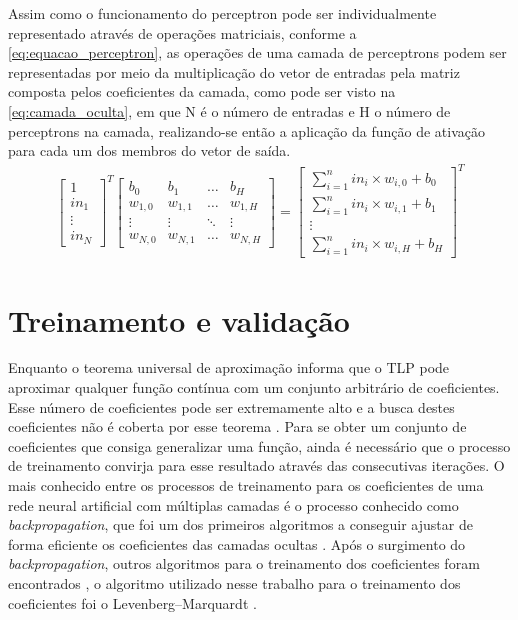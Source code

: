 Assim como o funcionamento do perceptron pode ser individualmente representado através de operações matriciais, conforme a \autoref{eq:equacao_perceptron}, as operações de uma camada de perceptrons podem ser representadas por meio da multiplicação do vetor de entradas pela matriz composta pelos coeficientes da camada, como pode ser visto na \autoref{eq:camada_oculta}, em que N é o número de entradas e H o número de perceptrons na camada, realizando-se então a aplicação da função de ativação para cada um dos membros do vetor de saída.
\begin{align}
\begin{bmatrix}
1 \\ 
in_{1}\\ 
\vdots\\ 
in_{N}
\end{bmatrix}^{T}
\begin{bmatrix}
b_{0}   & b_{1}   & \hdots & b_{H} \\ 
w_{1,0} & w_{1,1} & \hdots & w_{1,H} \\ 
\vdots  & \vdots  & \ddots & \vdots \\ 
w_{N,0} & w_{N,1} & \hdots & w_{N,H}
\end{bmatrix}
=
\begin{bmatrix}
\sum\limits_{i=1}^{n} in_{i} \times w_{i,0} + b_{0}\\ 
\sum\limits_{i=1}^{n} in_{i} \times w_{i,1} + b_{1}\\ 
\vdots\\ 
\sum\limits_{i=1}^{n} in_{i} \times w_{i,H} + b_{H}
\end{bmatrix}^{T}
\label{eq:camada_oculta}
\end{align}

\section{Treinamento e validação} \label{sec:model-trei}
Enquanto o teorema universal de aproximação informa que o TLP pode aproximar qualquer função contínua com um conjunto arbitrário de coeficientes. Esse número de coeficientes pode ser extremamente alto e a busca destes coeficientes não é coberta por esse teorema \cite{Goodfellow-et-al-2016}. Para se obter um conjunto de coeficientes que consiga generalizar uma função, ainda é necessário que o processo de treinamento convirja para esse resultado através das consecutivas iterações. O mais conhecido entre os processos de treinamento para os coeficientes de uma rede neural artificial com múltiplas camadas é o processo conhecido como \textit{backpropagation}, que foi um dos primeiros algoritmos a conseguir ajustar de forma eficiente os coeficientes das camadas ocultas \cite{Goodfellow-et-al-2016} \cite{6302929}. Após o surgimento do \textit{backpropagation}, outros algoritmos para o treinamento dos coeficientes foram encontrados \cite{Khidirova2020} \cite{Escalante2006}, o algoritmo utilizado nesse trabalho para o treinamento dos coeficientes foi o Levenberg–Marquardt \cite{Marquardt1963}.


